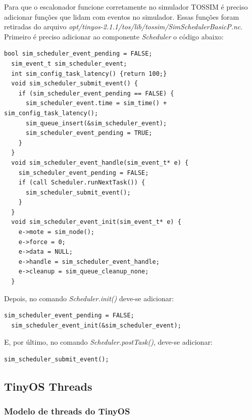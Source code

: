 \documentclass[a4paper, 10pt]{article}
\begin{document}
Para que o escalonador funcione corretamente no simulador TOSSIM é preciso adicionar funções que lidam com eventos no
simulador. Essas funções foram retiradas do arquivo
\textit{opt/tinyos-2.1.1/tos/lib/tossim/SimSchedulerBasicP.nc}.
Primeiro é preciso adicionar ao componente \textit{Scheduler} o código abaixo:
\begin{lstlisting}[frame=single]
  bool sim_scheduler_event_pending = FALSE;
  sim_event_t sim_scheduler_event;
  int sim_config_task_latency() {return 100;}
  void sim_scheduler_submit_event() {
    if (sim_scheduler_event_pending == FALSE) {
      sim_scheduler_event.time = sim_time() + sim_config_task_latency();
      sim_queue_insert(&sim_scheduler_event);
      sim_scheduler_event_pending = TRUE;
    }
  }
  void sim_scheduler_event_handle(sim_event_t* e) {
    sim_scheduler_event_pending = FALSE;
    if (call Scheduler.runNextTask()) {
      sim_scheduler_submit_event();
    }
  }
  void sim_scheduler_event_init(sim_event_t* e) {
    e->mote = sim_node();
    e->force = 0;
    e->data = NULL;
    e->handle = sim_scheduler_event_handle;
    e->cleanup = sim_queue_cleanup_none;
  }
\end{lstlisting}

Depois, no comando \textit{Scheduler.init()} deve-se adicionar:
\begin{lstlisting}[frame=single]
  sim_scheduler_event_pending = FALSE;
  sim_scheduler_event_init(&sim_scheduler_event);
\end{lstlisting}
E, por último, no comando \textit{Scheduler.postTask()}, deve-se adicionar:
\begin{lstlisting}[frame=single]
  sim_scheduler_submit_event();
\end{lstlisting}

\subsection{TinyOS Threads} \label{TOSThreads}
\subsubsection{Modelo de threads do TinyOS}
\end{document}
